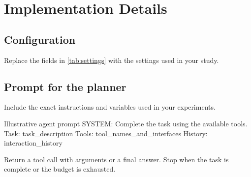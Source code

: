 \section{Implementation Details}
\label{app:details}

\subsection{Configuration}
Replace the fields in \cref{tab:settings} with the settings used in your study.


\subsection{Prompt for the planner}
\label{app:prompts}
Include the exact instructions and variables used in your experiments.
\begin{rpsprompt}{Illustrative agent prompt}
SYSTEM: Complete the task using the available tools.
Task: {task_description}
Tools: {tool_names_and_interfaces}
History: {interaction_history}

Return a tool call with arguments or a final answer.
Stop when the task is complete or the budget is exhausted.
\end{rpsprompt}
